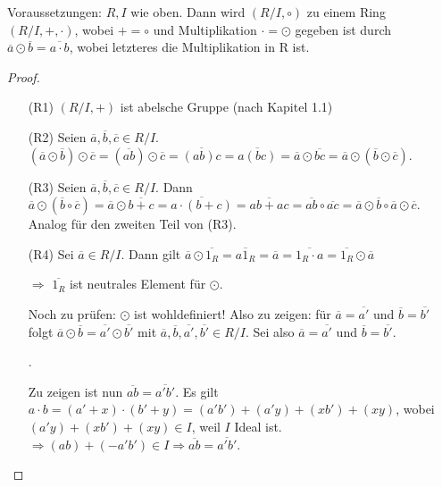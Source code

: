 \documentclass[12pt,a4paper]{scrartcl}
\begin{document}
\begin{satz}
	Voraussetzungen: $R, I$ wie oben. Dann wird $(R/I, \circ)$ zu einem Ring $(R/I,+,\cdot)$, wobei $+=\circ$ und Multiplikation $\cdot  = \odot$ gegeben ist durch $\overline{a}\odot \overline{b} = \overline{a\cdot b}$, wobei letzteres die Multiplikation in R ist.
\end{satz}
\begin{proof}
	\leavevmode
	\begin{itemize}
		\item[(R1)] $(R/I,+)$ ist abelsche Gruppe (nach Kapitel 1.1)
		\item[(R2)] Seien $\overline{a},\overline{b},\overline{c}\in R/I$. $(\overline{a}\odot\overline{b})\odot\overline{c}  = (\overline{ab})\odot \overline{c} = \overline{(ab)c} = \overline{a(bc)}  = \overline{a}\odot \overline{bc} = \overline{a}\odot(\overline{b}\odot\overline{c})$. 
		\item[(R3)] Seien $\overline{a},\overline{b},\overline{c}\in R/I$. Dann $\overline{a}\odot(\overline{b}\circ \overline{c}) = \overline{a}\odot\overline{b+c} = \overline{a\cdot(b+c)} =\overline{ab+ac} = \overline{ab}\circ\overline{ac} = \overline{a}\odot \overline{b}\circ\overline{a}\odot\overline{c}$. Analog für den zweiten Teil von (R3).
		\item[(R4)] Sei $\overline{a}\in R/I$. Dann gilt $\overline{a}\odot\overline{1_R}  = \overline{a1_R} = \overline{a} = \overline{1_R\cdot a} = \overline{1_R}\odot \overline{a}$
		
		$\Rightarrow$ $\overline{1_R}$ ist neutrales Element für $\odot$.
		\item[] Noch zu prüfen: $\odot$ ist wohldefiniert! Also zu zeigen: für $\overline{a} = \overline{a'}$ und $\overline{b} = \overline{b'}$ folgt $\overline{a}\odot\overline{b} = \overline{a'}\odot\overline{b'}$ mit $\overline{a},\overline{b},\overline{a'},\overline{b'}\in R/I$. Sei also $\overline{a} = \overline{a'}$ und $\overline{b} = \overline{b'}$. 
		
		.
		
		Zu zeigen ist nun $\overline{ab} = \overline{a'b'}$. Es gilt $a\cdot b = (a'+x)\cdot (b'+y)  = (a'b')+(a'y)+(xb')+(xy)$, wobei $(a'y)+(xb')+(xy)\in I$, weil $I$ Ideal ist. $\Rightarrow (ab)+(-a'b')\in I\Rightarrow \overline{ab} = \overline{a'b'}$.
	\end{itemize}
\end{proof}








\end{document}
